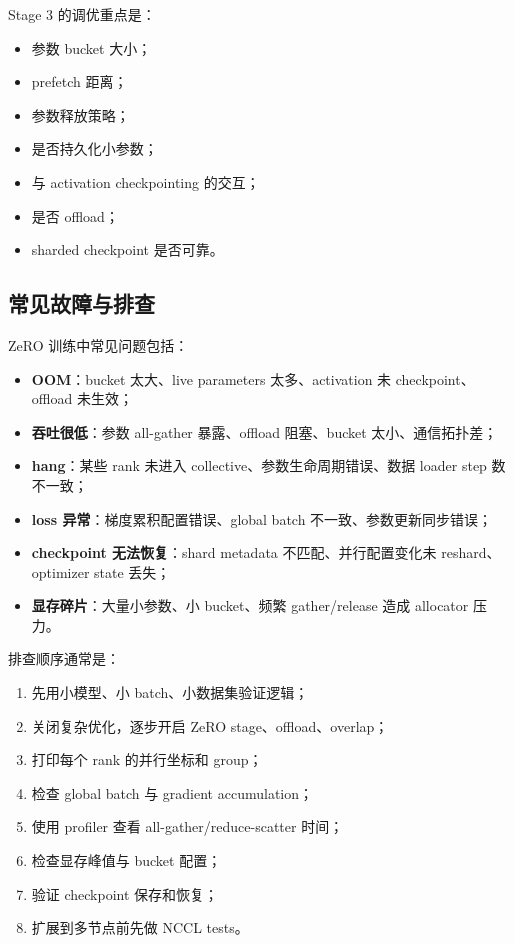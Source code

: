 Stage 3 的调优重点是：

\begin{itemize}
\item 参数 bucket 大小；
\item prefetch 距离；
\item 参数释放策略；
\item 是否持久化小参数；
\item 与 activation checkpointing 的交互；
\item 是否 offload；
\item sharded checkpoint 是否可靠。
\end{itemize}

\subsection{常见故障与排查}
\label{subsec:zero-common-failures}

ZeRO 训练中常见问题包括：

\begin{itemize}
\item \textbf{OOM}：bucket 太大、live parameters 太多、activation 未 checkpoint、offload 未生效；
\item \textbf{吞吐很低}：参数 all-gather 暴露、offload 阻塞、bucket 太小、通信拓扑差；
\item \textbf{hang}：某些 rank 未进入 collective、参数生命周期错误、数据 loader step 数不一致；
\item \textbf{loss 异常}：梯度累积配置错误、global batch 不一致、参数更新同步错误；
\item \textbf{checkpoint 无法恢复}：shard metadata 不匹配、并行配置变化未 reshard、optimizer state 丢失；
\item \textbf{显存碎片}：大量小参数、小 bucket、频繁 gather/release 造成 allocator 压力。
\end{itemize}

排查顺序通常是：

\begin{enumerate}
\item 先用小模型、小 batch、小数据集验证逻辑；
\item 关闭复杂优化，逐步开启 ZeRO stage、offload、overlap；
\item 打印每个 rank 的并行坐标和 group；
\item 检查 global batch 与 gradient accumulation；
\item 使用 profiler 查看 all-gather/reduce-scatter 时间；
\item 检查显存峰值与 bucket 配置；
\item 验证 checkpoint 保存和恢复；
\item 扩展到多节点前先做 NCCL tests。
\end{enumerate}

